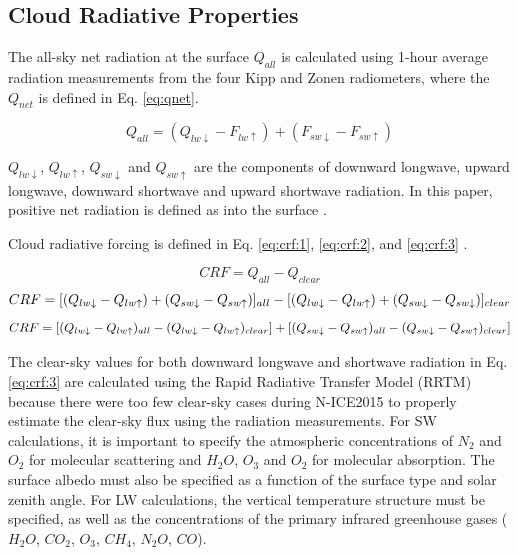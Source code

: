 \subsection{Cloud Radiative Properties}
The all-sky net radiation at the surface $Q_{all}$ is calculated using 1-hour average radiation measurements from the four Kipp and Zonen radiometers, where the $Q_{net}$ is defined in Eq. \ref{eq:qnet}.

\begin{equation}\label{eq:qnet}
Q_{all} = (Q_{lw \downarrow} - F_{lw \uparrow}) + (F_{sw \downarrow} - F_{sw \uparrow})
\end{equation}

$Q_{lw \downarrow}$, $Q_{lw \uparrow}$, $Q_{sw \downarrow}$ and $Q_{sw \uparrow}$ are the components of downward longwave, upward longwave, downward shortwave and upward shortwave radiation. In this paper, positive net radiation is defined as into the surface \citep{miller:2015}.

Cloud radiative forcing is defined in Eq. \ref{eq:crf:1}, \ref{eq:crf:2}, and \ref{eq:crf:3} \citep{ramanathan:1989, miller:2015}.

\begin{equation}\label{eq:crf:1}
CRF = Q_{all} - Q_{clear}
\end{equation}
\begin{dmath}\label{eq:crf:2}
CRF = [(Q_{lw \downarrow} - Q_{lw \uparrow}) + (Q_{sw \downarrow} - Q_{sw \uparrow})]_{all} \\
\\ - [(Q_{lw \downarrow} - Q_{lw \uparrow}) + (Q_{sw \downarrow} - Q_{sw \downarrow})]_{clear}
\end{dmath}
\begin{dmath}\label{eq:crf:3}
CRF = [(Q_{lw \downarrow} - Q_{lw \uparrow})_{all} - (Q_{lw \downarrow} - Q_{lw \uparrow})_{clear}] \\
\\ + [(Q_{sw \downarrow} - Q_{sw \uparrow})_{all} -  (Q_{sw \downarrow} - Q_{sw \uparrow})_{clear}]
\end{dmath}

The clear-sky values for both downward longwave and shortwave radiation in Eq. \ref{eq:crf:3} are calculated using the Rapid Radiative Transfer Model (RRTM) \citep{mlawer:1997} because there were too few clear-sky cases during N-ICE2015 to properly estimate the clear-sky flux using the radiation measurements. For SW calculations, it is important to specify the atmospheric concentrations of $N_{2}$ and $O_{2}$ for molecular scattering and $H_{2}O$, $O_{3}$ and $O_{2}$ for molecular absorption. The surface albedo must also be specified as a function of the surface type and solar zenith angle. For LW calculations, the vertical temperature structure must be specified, as well as the concentrations of the primary infrared greenhouse gases ($H_{2}O$, $CO_{2}$, $O_{3}$, $CH_{4}$, $N_{2}O$, $CO$).

